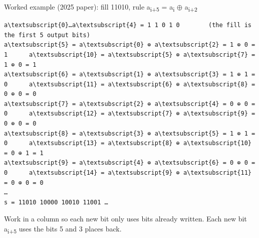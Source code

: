 \documentclass[11pt,a4paper]{article}
\begin{document}
\begin{example}{Worked example (2025 paper): fill 11010, rule a\textsubscript{i+5} = a\textsubscript{i} \ensuremath{\oplus} a\textsubscript{i+2}}
\begin{workbox}
\begin{Verbatim}[commandchars=\\\{\},fontsize=\footnotesize]
a\textsubscript{0}…a\textsubscript{4} = 1 1 0 1 0        (the fill is the first 5 output bits)
a\textsubscript{5} = a\textsubscript{0} ⊕ a\textsubscript{2} = 1 ⊕ 0 = 1      a\textsubscript{10} = a\textsubscript{5} ⊕ a\textsubscript{7} = 1 ⊕ 0 = 1
a\textsubscript{6} = a\textsubscript{1} ⊕ a\textsubscript{3} = 1 ⊕ 1 = 0      a\textsubscript{11} = a\textsubscript{6} ⊕ a\textsubscript{8} = 0 ⊕ 0 = 0
a\textsubscript{7} = a\textsubscript{2} ⊕ a\textsubscript{4} = 0 ⊕ 0 = 0      a\textsubscript{12} = a\textsubscript{7} ⊕ a\textsubscript{9} = 0 ⊕ 0 = 0
a\textsubscript{8} = a\textsubscript{3} ⊕ a\textsubscript{5} = 1 ⊕ 1 = 0      a\textsubscript{13} = a\textsubscript{8} ⊕ a\textsubscript{10} = 0 ⊕ 1 = 1
a\textsubscript{9} = a\textsubscript{4} ⊕ a\textsubscript{6} = 0 ⊕ 0 = 0      a\textsubscript{14} = a\textsubscript{9} ⊕ a\textsubscript{11} = 0 ⊕ 0 = 0
…
s = 11010 10000 10010 11001 …
\end{Verbatim}
\end{workbox}
Work in a column so each new bit only uses bits already written. Each new bit a\textsubscript{i+5} uses the bits 5 and 3 places back.\par
\end{example}
\end{document}
